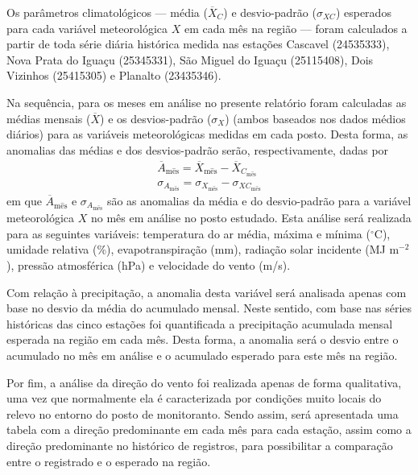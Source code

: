 \documentclass[a4paper,12pt]{article}
\begin{document}
Os parâmetros climatológicos --- média ($\overline{X}_C$) e desvio-padrão ($\sigma_{XC}$) 
esperados para cada variável meteorológica $X$ em 
cada mês na região --- foram calculados a partir de toda série diária histórica medida 
nas estações Cascavel (24535333), Nova Prata do Iguaçu (25345331), São Miguel do Iguaçu (25115408), 
Dois Vizinhos (25415305) e Planalto (23435346). 

Na sequência, para os meses em análise no presente relatório foram calculadas as médias mensais ($\overline{X}$) e os 
desvios-padrão ($\sigma_X$) (ambos baseados nos dados médios diários) para as variáveis meteorológicas medidas em cada posto. 
Desta forma, as anomalias das médias e dos desvios-padrão serão, respectivamente, dadas por
%
\begin{align*}
\overline{A}_{\mathrm{m\hat{e}s}} = \overline{X}_{\mathrm{m\hat{e}s}} - \overline{X}_{C_{\mathrm{m\hat{e}s}}} \\ 
\sigma_{A_\mathrm{m\hat{e}s}} = \sigma_{X_\mathrm{m\hat{e}s}} - \sigma_{XC_\mathrm{m\hat{e}s}} 
\end{align*}
%
em que $\overline{A}_\mathrm{m\hat{e}s}$ e $\sigma_{A_\mathrm{m\hat{e}s}}$  são as anomalias da média e do 
desvio-padrão para a variável meteorológica $X$ no mês em análise
no posto estudado. Esta análise será realizada para as seguintes variáveis: temperatura do ar média, máxima
e mínima ($^\circ$C), 
umidade relativa (\%), evapotranspiração (mm), radiação solar incidente (MJ m$^{-2}$), 
pressão atmosférica (hPa) e velocidade do vento (m/s).

Com relação à precipitação, a anomalia desta variável será analisada apenas com base no desvio da média do acumulado mensal. Neste sentido, 
com base nas séries históricas das cinco estações foi quantificada a precipitação acumulada mensal
esperada na região em cada mês. Desta forma, a anomalia será o desvio entre o acumulado no mês 
em análise e o acumulado esperado para este mês na região.

Por fim, a análise da direção do vento foi realizada apenas de forma qualitativa, uma vez que normalmente
ela é caracterizada por condições muito locais do relevo no entorno do posto de monitoranto. Sendo assim, será
apresentada uma tabela com a direção predominante em cada mês para cada estação, assim como a direção predominante no histórico 
de registros, para possibilitar a comparação entre o registrado e o esperado na região.



\newpage
\end{document}
